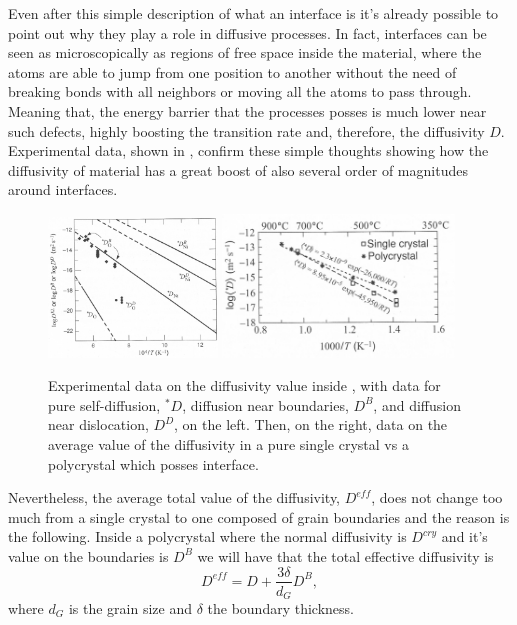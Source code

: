 Even after this simple description of what an interface is it's already possible to point out why they play a role in diffusive processes. In fact, interfaces can be seen as microscopically as regions of free space inside the material, where the atoms are able to jump from one position to another without the need of breaking bonds with all neighbors or moving all the atoms to pass through. Meaning that, the energy barrier that the processes posses is much lower near such defects, highly boosting the transition rate and, therefore, the diffusivity $D$. Experimental data, shown in , confirm these simple thoughts showing how the diffusivity of material has a great boost of also several order of magnitudes around interfaces. 
\begin{figure}[t]
    \centering
    \includegraphics[width=0.4\textwidth]{Immagini/Dbound.png}
    \includegraphics[width=0.55\textwidth]{Immagini/Dmean.png}
    \caption
    {
        Experimental data on the diffusivity value inside , with data for pure self-diffusion, $^*D$, diffusion near boundaries, $D^B$, and diffusion near dislocation, $D^D$, on the left. Then, on the right, data on the average value of the diffusivity in a pure single crystal vs a polycrystal which posses interface.
    }
    \label{fig:DiffusivityComp}
\end{figure}
Nevertheless, the average total value of the diffusivity, $D^{eff}$, does not change too much from a single crystal to one composed of grain boundaries and the reason is the following.
{
    Inside a polycrystal where the normal diffusivity is $D^{cry}$ and it's value on the boundaries is $D^B$ we will have that the total effective diffusivity is
    \begin{equation}
        D^{eff} = D + \frac{3\delta}{d_G}D^B,
    \end{equation}
    where $d_G$ is the grain size and $\delta$ the boundary thickness.
}
